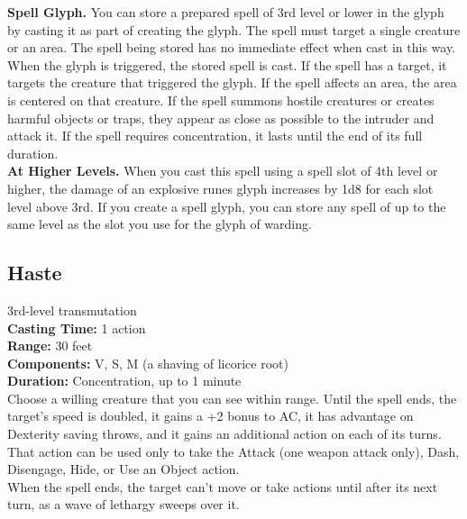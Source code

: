\documentclass[11pt, A4paper, english]{article}
\begin{document}
\textbf{Spell Glyph.} You can store a prepared spell of 3rd level or lower in the glyph by casting it as part of creating the glyph. The spell must target a single creature or an area. The spell being stored has no immediate effect when cast in this way. When the glyph is triggered, the stored spell is cast. If the spell has a target, it targets the creature that triggered the glyph. If the spell affects an area, the area is centered on that creature. If the spell summons hostile creatures or creates harmful objects or traps, they appear as close as possible to the intruder and attack it. If the spell requires concentration, it lasts until the end of its full duration. \\
\textbf{At Higher Levels.} When you cast this spell using a spell slot of 4th level or higher, the damage of an explosive runes glyph increases by 1d8 for each slot level above 3rd. If you create a spell glyph, you can store any spell of up to the same level as the slot you use for the glyph of warding.

		\subsection{Haste}
3rd-level transmutation \\
\textbf{Casting Time:} 1 action \\
\textbf{Range:} 30 feet \\
\textbf{Components:} V, S, M (a shaving of licorice root) \\
\textbf{Duration:} Concentration, up to 1 minute \\
Choose a willing creature that you can see within range. Until the spell ends, the target’s speed is doubled, it gains a +2 bonus to AC, it has advantage on Dexterity saving throws, and it gains an additional action on each of its turns. That action can be used only to take the Attack (one weapon attack only), Dash, Disengage, Hide, or Use an Object action. \\
When the spell ends, the target can’t move or take actions until after its next turn, as a wave of lethargy sweeps over it.
\end{document}
